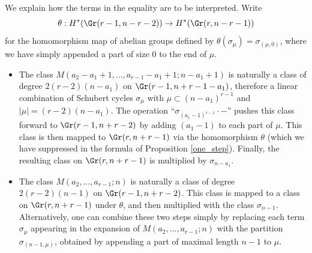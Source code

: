 We explain how the terms in the equality are to be interpreted. Write 
\begin{equation*}
\theta:H^{*}(\Gr(r-1,n-r-2))\to H^{*}(\Gr(r,n-r-1))
\end{equation*}
for the homomorphism map of abelian groups defined by $\theta(\sigma_\mu)=\sigma_{(\mu,0)}$, where we have simply appended a part of size 0 to the end of $\mu$.
\begin{itemize}
\item The class $M(a_2-a_1+1,\ldots,a_{r-1}-a_1+1;n-a_1+1)$ is naturally a class of degree $2(r-2)(n-a_1)$ on $\Gr(r-1,n+r-1-a_1)$, therefore a linear combination of Schubert cycles $\sigma_\mu$ with $\mu\subset(n-a_1)^{r-1}$ and $|\mu|=(r-2)(n-a_1)$. The operation ``$\sigma_{(a_1-1)^{r-1}}\cdot-$'' pushes this class forward to $\Gr(r-1,n+r-2)$ by adding $(a_1-1)$ to each part of $\mu$. This class is then mapped to $\Gr(r,n+r-1)$ via the homomorphism $\theta$ (which we have suppressed in the formula of Proposition \ref{one_step}). Finally, the resulting class on $\Gr(r,n+r-1)$ is multiplied by $\sigma_{n-a_1}$.

\item The class $M(a_2,\ldots,a_{r-1};n)$ is naturally a class of degree $2(r-2)(n-1)$ on $\Gr(r-1,n+r-2)$. This class is mapped to a class on $\Gr(r,n+r-1)$ under $\theta$, and then multiplied with the class $\sigma_{n-1}$. Alternatively, one can combine these two steps simply by replacing each term $\sigma_{\mu}$ appearing in the expansion of $M(a_2,\ldots,a_{r-1};n)$ with the partition $\sigma_{(n-1,\mu)}$, obtained by appending a part of maximal length $n-1$ to $\mu$.
\end{itemize}


